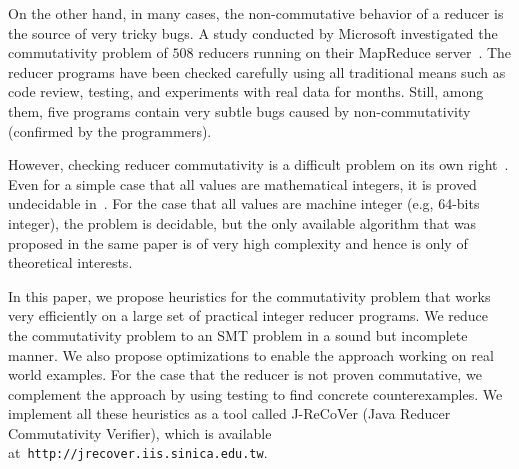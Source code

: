 \documentclass{llncs}
\newcommand{\hide}[1]{}
\begin{document}
\hide{More concretely, for the verification of a MapReduce program, we propose to do it in two phases. First, ensuring if all reducers are commutative. If some reducers are non-commutative, modifying them to commutative ones. Usually, the modification is not a difficult task~\cite{xiao14mr}, and can be done without affecting their functionality and performance. For example, assume that the task of a reducer is to find the name of the person with highest score. Such a reducer is non-commutative when the input include two people with the same highest score. This reducer can be made commutative, by also comparing the ID number of people with the same score. Once all reducers are made commutative, we reduce the verification problem to sequential verification by fixing a scheduler. In this two-phase approach, the key enabling technique is an efficient procedure for checking reducer commutativity.}

On the other hand, in many cases, the non-commutative behavior of a reducer is the source of very tricky bugs. A study conducted by Microsoft investigated the commutativity problem of $508$ reducers running on their MapReduce server~\cite{xiao14mr}. The reducer programs have been checked carefully using all traditional means such as code review, testing, and experiments with real data for months. Still, among them, five programs contain very subtle bugs caused by non-commutativity (confirmed by the programmers).

However, checking reducer commutativity is a difficult problem on its own right~\cite{ChenHSW15,ChenSW16,ChenLTW17}. Even for a simple case that all values are mathematical integers, it is proved undecidable in~\cite{ChenHSW15}. For the case that all values are machine integer (e.g, 64-bits integer), the problem is decidable, but the only available algorithm that was proposed in the same paper is of very high complexity and hence is only of theoretical interests.

In this paper, we propose heuristics for the commutativity problem that works very efficiently on a large set of practical integer reducer programs. We reduce the commutativity problem to an SMT problem in a sound but incomplete manner. We also propose optimizations to enable the approach working on real world examples. For the case that the reducer is not proven commutative, we complement the approach by using testing to find concrete counterexamples. We implement all these heuristics as a tool called J-ReCoVer (Java Reducer Commutativity Verifier), which is available at~\verb|http://jrecover.iis.sinica.edu.tw|.
\end{document}

